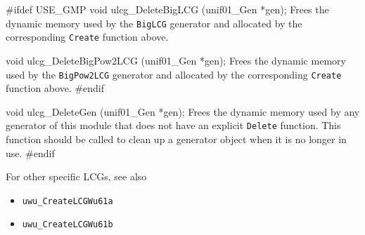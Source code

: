 \code


#ifdef USE_GMP
   void ulcg_DeleteBigLCG (unif01_Gen *gen);
\endcode
 \tab  Frees the dynamic memory used by the {\tt BigLCG}
  generator and allocated by the corresponding {\tt Create} function
 above.
 \endtab
\code


   void ulcg_DeleteBigPow2LCG (unif01_Gen *gen);
\endcode
 \tab  Frees the dynamic memory used by the {\tt BigPow2LCG}
  generator and allocated by the corresponding {\tt Create} function
  above.
 \endtab
\code
#endif


void ulcg_DeleteGen (unif01_Gen *gen);
\endcode
 \tab Frees the dynamic memory used by any generator of this module
  that does not have an explicit {\tt Delete} function.
  This function should be called to clean up a generator object
  when it is no longer in use.
 \endtab
\code
\hide
#endif
\endhide
\endcode


{ For other specific LCGs, see also

\begin{itemize}
\item {\tt uwu\_CreateLCGWu61a}
\item {\tt uwu\_CreateLCGWu61b}
\end{itemize}
}
